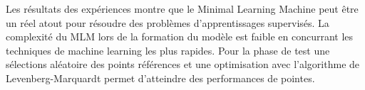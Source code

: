 \documentclass[12pt,a4paper]{report}
\begin{document}
\par Les résultats des expériences montre que le Minimal Learning Machine peut être un réel atout pour résoudre des problèmes d'apprentissages supervisés. La complexité du MLM lors de la formation du modèle est faible  en concurrant les techniques de machine learning les plus rapides. Pour la phase de test une sélections aléatoire des points références et une optimisation avec l'algorithme de Levenberg-Marquardt permet d'atteindre des performances de pointes.\\
\end{document}
